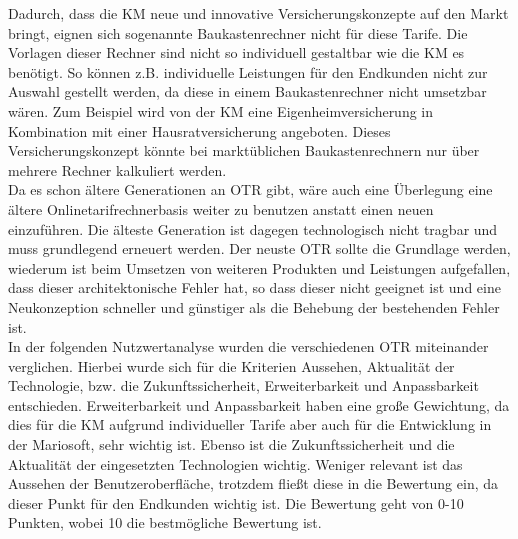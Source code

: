 Dadurch, dass die \ac{KM} neue und innovative Versicherungskonzepte auf den Markt bringt, eignen sich sogenannte Baukastenrechner nicht für diese Tarife. Die Vorlagen dieser Rechner sind nicht so individuell gestaltbar wie die \ac{KM} es benötigt. So können z.B. individuelle Leistungen für den Endkunden nicht zur Auswahl gestellt werden, da diese in einem Baukastenrechner nicht umsetzbar wären. Zum Beispiel wird von der \ac{KM} eine Eigenheimversicherung in Kombination mit einer Hausratversicherung angeboten. Dieses Versicherungskonzept könnte bei marktüblichen Baukastenrechnern nur über mehrere Rechner kalkuliert werden.\\
Da es schon ältere Generationen an \ac{OTR} gibt, wäre auch eine Überlegung eine ältere Onlinetarifrechnerbasis weiter zu benutzen anstatt einen neuen einzuführen. Die älteste Generation ist dagegen technologisch nicht tragbar und muss grundlegend erneuert werden. Der neuste \ac{OTR} sollte die Grundlage werden, wiederum ist beim Umsetzen von weiteren Produkten und Leistungen aufgefallen, dass dieser architektonische Fehler hat, so dass dieser nicht geeignet ist und eine Neukonzeption schneller und günstiger als die Behebung der bestehenden Fehler ist.\\
In der folgenden Nutzwertanalyse wurden die verschiedenen \ac{OTR} miteinander verglichen. Hierbei wurde sich für die Kriterien Aussehen, Aktualität der Technologie, bzw. die Zukunftssicherheit, Erweiterbarkeit und Anpassbarkeit entschieden. Erweiterbarkeit und Anpassbarkeit haben eine große Gewichtung, da dies für die \ac{KM} aufgrund individueller Tarife aber auch für die Entwicklung in der Mariosoft, sehr wichtig ist. Ebenso ist die Zukunftssicherheit und die Aktualität der eingesetzten Technologien wichtig. Weniger relevant ist das Aussehen der Benutzeroberfläche, trotzdem fließt diese in die Bewertung ein, da dieser Punkt für den Endkunden wichtig ist. Die Bewertung geht von 0-10 Punkten, wobei 10 die bestmögliche Bewertung ist.\\

